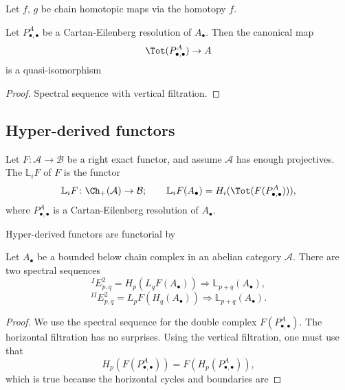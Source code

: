 \documentclass[main.tex]{subfiles}
\begin{document}
\begin{proposition}
  Let $f$, $g$ be chain homotopic maps via the homotopy $f$.
\end{proposition}

\begin{proposition}
  Let $P^{A}_{\bullet,\bullet}$ be a Cartan-Eilenberg resolution of $A_{\bullet}$. Then the canonical map
  \begin{equation*}
    \Tot(P^{A}_{\bullet,\bullet}) \to A
  \end{equation*}
  is a quasi-isomorphism
\end{proposition}
\begin{proof}
  Spectral sequence with vertical filtration.
\end{proof}

\subsection{Hyper-derived functors}
\label{ssc:hyper_derived_functors}

\begin{definition}
  \label{def:left_hyper_derived_functor}
  Let $F\colon \mathcal{A} \to \mathcal{B}$ be a right exact functor, and assume $\mathcal{A}$ has enough projectives. The  $\mathbb{L}_{i}F$ of $F$ is the functor
  \begin{equation*}
    \mathbb{L}_{i}F\colon \Ch_{+}(\mathcal{A}) \to \mathcal{B};\qquad \mathbb{L}_{i}F(A_{\bullet}) = H_{i}(\Tot(F(P^{A}_{\bullet, \bullet}))),
  \end{equation*}
  where $P^{A}_{\bullet, \bullet}$ is a Cartan-Eilenberg resolution of $A_{\bullet}$.
\end{definition}

Hyper-derived functors are functorial by

\begin{proposition}
  \label{prop:horizontal_and_vertical_filtration}
  Let $A_{\bullet}$ be a bounded below chain complex in an abelian category $\mathcal{A}$. There are two spectral sequences
  \begin{equation*}
    ^{I}E^{2}_{p,q} = H_{p}(L_{q}F(A_{\bullet})) \Longrightarrow \mathbb{L}_{p+q}(A_{\bullet}),
  \end{equation*}
  \begin{equation*}
    ^{II}E^{2}_{p,q} = L_{p}F(H_{q}(A_{\bullet})) \Longrightarrow \mathbb{L}_{p+q}(A_{\bullet}).
  \end{equation*}
\end{proposition}
\begin{proof}
  We use the spectral sequence for the double complex $F(P^{A}_{\bullet,\bullet})$. The horizontal filtration has no surprises. Using the vertical filtration, one must use that 
  \begin{equation*}
    H_{p}(F(P^{A}_{\bullet, \bullet})) = F(H_{p}(P^{A}_{\bullet,\bullet})),
  \end{equation*}
  which is true because the horizontal cycles and boundaries are
\end{proof}
\end{document}
